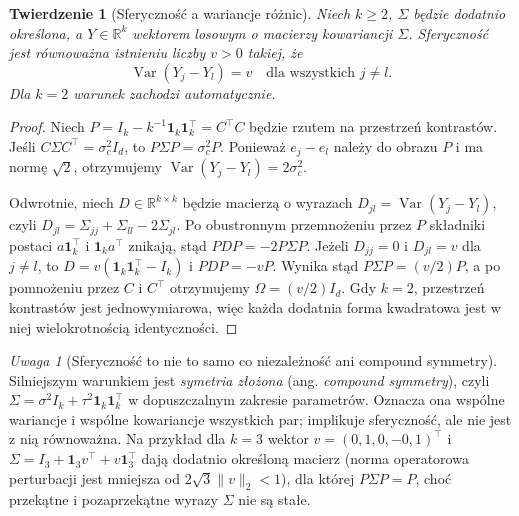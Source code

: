 \documentclass[11pt,a4paper,oneside]{report}
\numberwithin{equation}{chapter}
\theoremstyle{plain}
\newtheorem{twierdzenie}{Twierdzenie}[chapter]
\theoremstyle{definition}
\theoremstyle{remark}
\newtheorem{uwaga}{Uwaga}[chapter]
\newcommand{\R}{\mathbb R}
\newcommand{\Var}{\operatorname{Var}}
\begin{document}
\begin{twierdzenie}[Sferyczność a wariancje różnic]\label{thm:sphericity-differences}
Niech $k\ge2$, $\Sigma$ będzie dodatnio określona, a $Y\in\R^k$ wektorem losowym o macierzy kowariancji $\Sigma$. Sferyczność jest równoważna istnieniu liczby $v>0$ takiej, że
\[
 \Var(Y_j-Y_l)=v\quad\text{dla wszystkich }j\ne l.
\]
Dla $k=2$ warunek zachodzi automatycznie.
\end{twierdzenie}
\begin{proof}
Niech $P=I_k-k^{-1}\mathbf1_k\mathbf1_k^\top=C^\top C$ będzie rzutem na przestrzeń kontrastów. Jeśli $C\Sigma C^\top=\sigma_c^2 I_d$, to $P\Sigma P=\sigma_c^2P$. Ponieważ $e_j-e_l$ należy do obrazu $P$ i ma normę $\sqrt2$, otrzymujemy $\Var(Y_j-Y_l)=2\sigma_c^2$.

Odwrotnie, niech $D\in\R^{k\times k}$ będzie macierzą o wyrazach $D_{jl}=\Var(Y_j-Y_l)$, czyli $D_{jl}=\Sigma_{jj}+\Sigma_{ll}-2\Sigma_{jl}$. Po obustronnym przemnożeniu przez $P$ składniki postaci $a\mathbf1_k^\top$ i $\mathbf1_k a^\top$ znikają, stąd $PDP=-2P\Sigma P$. Jeżeli $D_{jj}=0$ i $D_{jl}=v$ dla $j\ne l$, to $D=v(\mathbf1_k\mathbf1_k^\top-I_k)$ i $PDP=-vP$. Wynika stąd $P\Sigma P=(v/2)P$, a po pomnożeniu przez $C$ i $C^\top$ otrzymujemy $\Omega=(v/2)I_d$. Gdy $k=2$, przestrzeń kontrastów jest jednowymiarowa, więc każda dodatnia forma kwadratowa jest w niej wielokrotnością identyczności.
\end{proof}

\begin{uwaga}[Sferyczność to nie to samo co niezależność ani compound symmetry]
Silniejszym warunkiem jest \emph{symetria złożona} (ang. \emph{compound symmetry}), czyli $\Sigma=\sigma^2I_k+\tau^2\mathbf1_k\mathbf1_k^\top$ w dopuszczalnym zakresie parametrów. Oznacza ona wspólne wariancje i wspólne kowariancje wszystkich par; implikuje sferyczność, ale nie jest z nią równoważna. Na przykład dla $k=3$ wektor $v=(0{,}1,0,-0{,}1)^\top$ i $\Sigma=I_3+\mathbf1_3v^\top+v\mathbf1_3^\top$ dają dodatnio określoną macierz (norma operatorowa perturbacji jest mniejsza od $2\sqrt3\|v\|_2<1$), dla której $P\Sigma P=P$, choć przekątne i pozaprzekątne wyrazy $\Sigma$ nie są stałe.
\end{uwaga}
\end{document}
